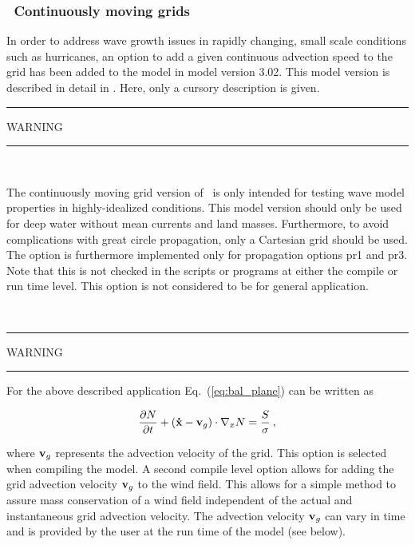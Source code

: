 \vsssub
\subsubsection{~Continuously moving grids} \label{sub:num_move}



In order to address wave growth issues in rapidly changing, small scale
conditions such as hurricanes, an option to add a given continuous advection
speed to the grid has been added to the model in model version 3.02. This
model version is described in detail in \cite{tol:OMOD05b}. Here, only a
cursory description is given.



\begin{center}
\rule[1mm]{55mm}{1.0mm} WARNING \rule[1mm]{55mm}{1.0mm} \\
 \vspace{\baselineskip}
\parbox{120mm}{The continuously moving grid version of \ws\ is only intended 
for testing wave model properties in highly-idealized conditions. This model
version should only be used for deep water without mean currents and land
masses. Furthermore, to avoid complications with great circle propagation,
only a Cartesian grid should be used. The option is furthermore implemented only
for propagation options {\F pr1} and {\F pr3}. Note that this is not checked
in the scripts or programs at either the compile or run time level.  This
option is not considered to be for general application.} \\
\vspace{\baselineskip}
\rule[1mm]{55mm}{1.0mm} WARNING \rule[1mm]{55mm}{1.0mm}
\end{center}

\noindent
For the above described application Eq.~(\ref{eq:bal_plane}) can be written as

\begin{equation}
\frac{\partial N}{\partial t} + 
\left ( {\bf\dot{x}}-{\bf{v}}_g \right ) \cdot \nabla_x N  = 
\frac{S}{\sigma} \: , \label{eq:bal_move}
\end{equation}

\noindent
where ${\bf{v}}_g$ represents the advection velocity of the grid. This option
is selected when compiling the model. A second compile level
option allows for adding the grid advection velocity ${\bf{v}}_g$ to the wind
field. This allows for a simple method to assure mass conservation of a wind
field independent of the actual and instantaneous grid advection velocity. The
advection velocity ${\bf{v}}_g$ can vary in time and is provided by the user
at the run time of the model (see below).




